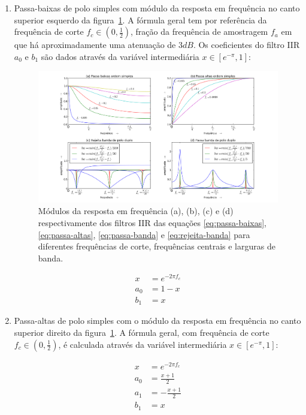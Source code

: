 \begin{enumerate}
\item Passa-baixas de polo simples com módulo da resposta em frequência no canto superior esquerdo da figura~\ref{fig:iir}. A fórmula geral tem
por referência da frequência de corte $f_c \in (0,\frac{1}{2})$,
fração da frequência de amostragem $f_a$
em que há aproximadamente uma atenuação de $3dB$.
Os coeficientes do filtro IIR
$a_0$ e $b_1$ 
são dados através da variável intermediária $x \in [e^{-\pi},1]$:

\begin{figure}[h!]
    \centering
        \includegraphics[width=\textwidth]{figuras/iir___}
    \caption{Módulos da resposta em frequência (a), (b), (c) e (d) respectivamente dos filtros IIR das equações \ref{eq:passa-baixas}, \ref{eq:passa-altas}, \ref{eq:passa-banda} e \ref{eq:rejeita-banda} para diferentes frequências de corte, frequências centrais e larguras de banda.}
        \label{fig:iir}
\end{figure}


\begin{equation}\label{eq:passa-baixas}
\begin{split}
x & =e^{-2\pi f_c} \\
a_0 & =  1-x \\
b_1 & =  x
\end{split}
\end{equation}

\item Passa-altas de polo simples com o módulo da resposta em frequência no canto superior direito da figura~\ref{fig:iir}. A fórmula geral,
com frequência de corte $f_c \in (0,\frac{1}{2})$, é calculada através da variável
intermediária $x \in [e^{-\pi},1]$:


\begin{equation}\label{eq:passa-altas}
\begin{split}
x & =e^{-2\pi f_c} \\
a_0 & =  \frac{x+1}{2} \\
a_1 & =  -\frac{x+1}{2} \\
b_1 & =  x
\end{split}
\end{equation}



\end{enumerate}

